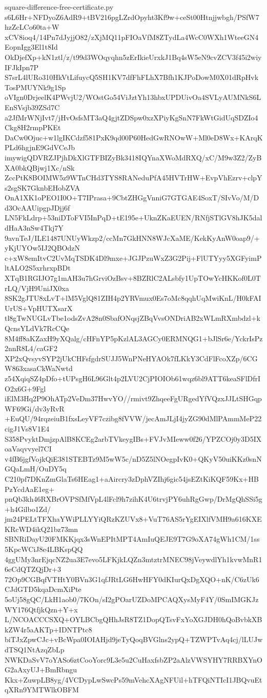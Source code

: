 \documentclass[11pt]{article}
\theoremstyle{definition}
\theoremstyle{remark}
\begin{document}
\begin{filecontents*}[overwrite]{square-difference-free-certificate.py}
s6L6Hr+NFDyoZ6AdR9+tBV216pgLZrdOpyht3Kf9w+ceSt00Htnjjwbgh/PSfW7hzZcLCo60ta+W
xCV8ioq4/14Pn7dJyjjO82/zXjMQ11pFIOaVfM8ZTydLa4WcC0WXh1WteeGN4EopnIgg3El1t8Id
OkDjefXp+kN1ztl/z/t99d3WOqyqhn5zErIkieUrxkJ1Bq4sW5eN9cvZCV3f45i2wiyIFJkIpn7P
S7srL4lURo310HkVtLifuycQ5SH1KV7dfFhFLhX7Bfh1KJPoDowM0X01dRpHvkTosPMUYNk9g1Sp
oVIgn0DrjeelK4PWvjU2/WOstGo54ViJztYh13hbxUPDUivOa4SVLyAUMNkS6LEnSVsjb39ZSd7C
a2JfMrWNjIvt7/jHvOsfsMT3aQ4gjtZDSpw0xzXPiyKgSnN7FkWtGidUqSDZIo4Ckg8H2rmpPKEt
DaCw0Ojuc+w1lgIKCdzf581PxK9qd00P60HedGwRNOwW+Ml0eD8Wx+KArqKPLd6hgjnE9GdVCeJb
imywigQDVRZJPjhDkXlGTFBIZyBk3418IQYnaXWoMdRXQ/xC/M9w3Z2/ZyBXA0bkQBjwj1Xc/nSk
ZccPtK8BOIMW5z9WTnCHd3TYS8RANeduPfA45HVTrHW+EvpVhEzrv+clpYs2sgSK7GknbEHobZVA
OnA1XK1oPEO1I0O+T7IPrasa+9CbtZHGgVnniG7GTGAE4SoxT/SIvVo/M/Dd3OcAAUipgpJDjj6f
LN5FkLdrp+53niDToFVI5InPqD+tE195e+UknZKaEUEN/RNfjSTlGV8hJK5daldHaA3nSw4Tkj7Y
9avnTeJ/ILE1487UNUyWkzp2/ccMn7GkHNN8WJcXaME/KekKyAnW0oap9/+yKjUYOw5IJ2QBOdzN
c+xW8emItvC2UvMqTSDK4Dl9mxe+JGJPzuWxZ3G2Pij+FlUTYyy5XGFyimPltALO2S5xrhrxpBDt
XTqB1RGIJO7g1mAH3u7hGrviOzBsv+8BZRlC2ALsbfy1UpTOwYcHKKof0L0TrLQ/VjH9UniJX0xa
8SK2gJTU8xLvT+lM5VglQ81ZIH4p2YRVmux0Es7oMc8qqhUqMwiKnL/H0kFAIUrUS+VpHUTXsarX
tl8gTwNUGLvTbe1odsZvA28n0SbafONqsjZBqVvsONDriAB2xWLmRXmbdzl+kQcnsYLdVk7RcCQe
8M4ff8aKZaxH9yXQalg/cHFnYP5pKzlAL3AGCy0ERMNQG1+bJlSr6e/YckrIsPz2nnR8L4/caGF2
XP2xQvsyvSYP2jUkCHFsfgdrSUJJ5WnPNeHYAOk7fLKkY3CdFlFcoXZp/6CGW863xasaCkWaNwtd
z54XqiqSZ4pDfo+tUPsgH6L96Glt4p2LVU2CjPIOIOb61wqz6bl9ATT6keaSFlDfrIO2x6G+9Fgl
iElM3Hq2P9OhATp2VeDm37HwvYO//rmivt9ZhqeeFgURgedYfVQzxJJLtSHGqpWF69Gi/dv3yRvR
+EuQU/94rqzeiuB1fxsLeyVF7czibg8fVVW/jecAmJLjI4jyZG90dMlPAmmMeP22cigJ1Vs8V1E4
S358PvyktDmjzpAlB8KCEg2arbTVkeygIBs+FVJvMIeww0f26/YPZCOj0y3D5IXoaVaqvvyel7CI
v4fB6jgfVojkQiE381STEBTz9M5wW5c/nD5Z5lNOegpIvK0+QKyV50uiKKz0snNGQaLmH/OuDY5q
C210pf7DKnZmGlaTs6HEag1+aAircry3zDphVZIhj6gic54jsEZtKiKQF59Kx+HBPzYcdAaE1eg+
pnQb3kh46RXBrOVPSfMfVpL4lFcl9h7zihK4U6trvjPY6uhRgGwp/DrMgQhSSi5g+h4Gilbo1Zd/
jm24PELtTFXhaYWiPLLYYiQRzKZUVx8+VuT76AS5rYgEIXlfVMH9a616KXEKRcWD4ikQ21bz73mn
SBNRiDayU20FMKKjqx3sWnEPItMPT4AmIuQEJE9T7G9oXA74gWh1CM/1ss5KpcWCiJ8e4LBKspQQ
4ggUMy3nrEjqcNZ2ua3E7evo5LFKjkLQZn3mtztrMNEC98jVeywdlYh1kvwMnR16eCdQTZQjDr+3
72Op9CGBqfVTHtY0BVn3G1qfJRtLG6HwHFY0dKIurQxDgXQO+nK/C6zUk6CJdGTD5kqaDcmXiPte
5oUj58gQC/LkH1aob0/7KOn/sI2gPOarUZDoMPCAQXysMyF4Y/0SmIMGKJzWY176QtfjkQzn+Y+x
L/NCOACCCSXQ+OYLBCbgQHhJsR8TZ1DopQTsvFxYoXGJDH0hQoBvbkXBkZW4r5aAKTp+IDNTPtc8
biTJxZpwCJc+vBcWpa0IOIAHjd9jeTyQoqBVGlns2ypQ+TZWPTvAq4cj/lLUJwdTSQ1NtAzqZbLp
NWKDaSvV7oYASo6ztCooYorc9L3e5u2CuHaxfsbZP2aAlzVWSYHY7RRBXYnOG2aAxyUJ+BmRbngu
Kkx+ZuwpLB8yg/4VCDypLwSwcPs59mVehcXAgNFUil+hTFQiNTIcI1JBQvuEtqXRn9YMTWlkOBFM

\end{filecontents*}
\end{document}
